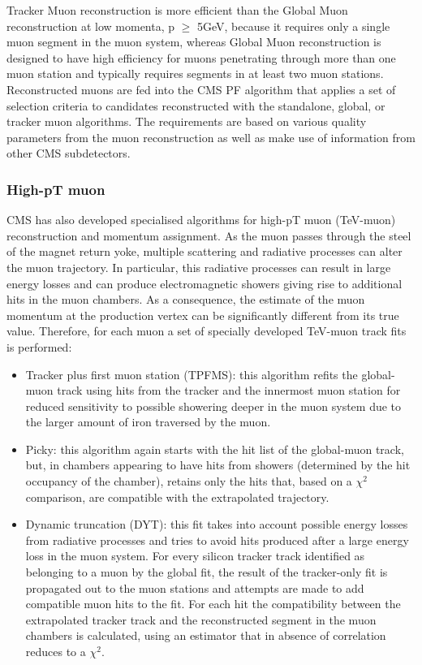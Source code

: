 Tracker Muon reconstruction is more efficient than the Global Muon reconstruction at low momenta, p $\ge$ 5GeV, because it requires only a single muon segment in the muon system, whereas Global Muon reconstruction is designed to have high efficiency for muons penetrating through more than one muon station and typically requires segments in at least two muon stations. 
Reconstructed muons are fed into the CMS PF algorithm that applies a set of selection criteria to candidates reconstructed with the standalone, global, or tracker muon algorithms. The requirements are based on various quality parameters from the muon reconstruction as well as make use of information from other CMS subdetectors. 
\subsubsection{High-pT muon}
CMS has also developed specialised algorithms for high-pT muon (TeV-muon) reconstruction and momentum assignment. As the muon passes through the steel of the magnet return yoke, multiple scattering and radiative processes can alter the muon trajectory. In particular, this radiative processes can result in large energy losses and can produce electromagnetic showers giving rise to additional hits in the muon chambers. As a consequence, the estimate of the muon momentum at the production vertex can be significantly different from its true value. Therefore, for each muon a set of specially developed TeV-muon track fits is performed:
\begin{itemize}
\item Tracker plus first muon station (TPFMS): this algorithm refits the global-muon track using hits from the tracker and the innermost muon station for reduced sensitivity to possible showering deeper in the muon system due to the larger amount of iron traversed by the muon.
\item Picky: this algorithm again starts with the hit list of the global-muon track, but, in chambers appearing to have hits from showers (determined by the hit occupancy of the chamber), retains only the hits that, based on a $\chi^2$ comparison, are compatible with the extrapolated trajectory.
\item Dynamic truncation (DYT): this fit takes into account possible energy losses from radiative processes and tries to avoid hits produced after a large energy loss in the muon system. For every silicon tracker track identified as belonging to a muon by the global fit, the result of the tracker-only fit is propagated out to the muon stations and attempts are made to add compatible muon hits to the fit. For each hit the compatibility between the extrapolated tracker track and the reconstructed segment in the muon chambers is calculated, using an estimator that in absence of correlation reduces to a $\chi^2$.
\end{itemize}
